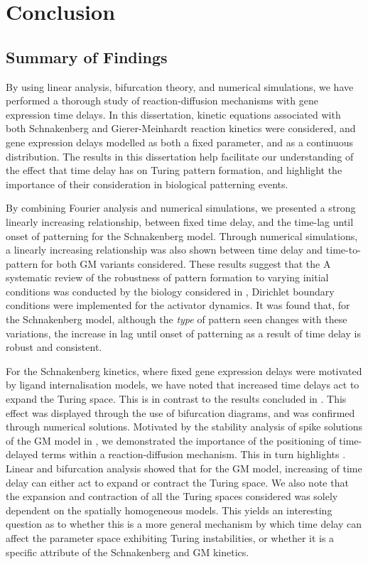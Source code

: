 \chapter{Conclusion}
\section{Summary of Findings}
By using linear analysis, bifurcation theory, and numerical simulations, we have performed a thorough study of reaction-diffusion mechanisms with gene expression time delays. In this dissertation, kinetic equations associated with both Schnakenberg and Gierer-Meinhardt reaction kinetics were considered, and gene expression delays modelled as both a fixed parameter, and as a continuous distribution. The results in this dissertation help facilitate our understanding of the effect that time delay has on Turing pattern formation, and highlight the importance of their consideration in biological patterning events.

By combining Fourier analysis and numerical simulations, we presented a strong linearly increasing relationship, between fixed time delay, and the time-lag until onset of patterning for the Schnakenberg model. Through numerical simulations, a linearly increasing relationship was also shown between time delay and time-to-pattern for both GM variants considered. These results suggest that the  A systematic review of the robustness of pattern formation to varying initial conditions was conducted  by the biology considered in \cite{krausemixed}, Dirichlet boundary conditions were implemented for the activator dynamics. It was found that, for the Schnakenberg model, although the \textit{type} of pattern seen changes with these variations, the increase in lag until onset of patterning as a result of time delay is robust and consistent.

For the Schnakenberg kinetics, where fixed gene expression delays were motivated by ligand internalisation models, we have noted that increased time delays act to expand the Turing space. This is in contrast to the results concluded in \cite{yigaffneyli}. This effect was displayed through the use of bifurcation diagrams, and was confirmed through numerical solutions.
Motivated by the stability analysis of spike solutions of the GM model in \cite{fadai1,fadai2}, we demonstrated the importance of the positioning of time-delayed terms within a reaction-diffusion mechanism. This in turn highlights . Linear and bifurcation analysis showed that for the GM model, increasing of time delay can either act to expand or contract the Turing space. We also note that the expansion and contraction of all the Turing spaces considered was solely dependent on the spatially homogeneous models. This yields an interesting question as to whether this is a more general mechanism by which time delay can affect the parameter space exhibiting Turing instabilities, or whether it is a specific attribute of the Schnakenberg and GM kinetics.

